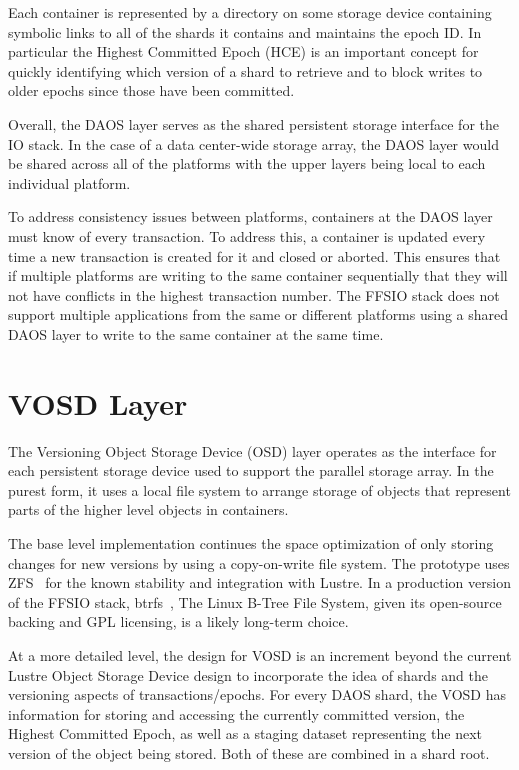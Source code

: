 \documentclass[conference]{IEEEtran}
\begin{document}
Each container is represented by a directory on some storage device containing
symbolic links to all of the shards it contains and maintains the epoch ID.
In particular the Highest Committed Epoch (HCE) is an important concept for
quickly identifying which version of a shard to retrieve and to block writes to
older epochs since those have been committed.

Overall, the DAOS layer serves as the shared persistent storage interface for
the IO stack. In the case of a data center-wide storage array, the DAOS layer
would be shared across all of the platforms with the upper layers being local
to each individual platform.

To address consistency issues between platforms, containers at the DAOS layer
must know of every transaction. To address this, a container is updated every
time a new transaction is created for it and closed or aborted. This ensures
that if multiple platforms are writing to the same container sequentially that
they will not have conflicts in the highest transaction number. The FFSIO stack
does not support multiple applications from the same or different platforms
using a shared DAOS layer to write to the same container at the same time.

\section{VOSD Layer}
\label{sec:vosd}

The Versioning Object Storage Device (OSD) layer operates as the interface for
each persistent storage device used to support the parallel storage array. In
the purest form, it uses a local file system to arrange storage of objects that
represent parts of the higher level objects in containers.

The base level implementation continues the space optimization of only storing
changes for new versions by using a copy-on-write file system. The prototype
uses ZFS~\cite{zhang:2010:zfs} for the known stability and integration with
Lustre. In a production version of the FFSIO stack,
btrfs~\cite{rodeh:2013:btrfs}, The Linux B-Tree File System, given its
open-source backing and GPL licensing, is a likely long-term choice.

At a more detailed level, the design for VOSD is an increment beyond the
current Lustre Object Storage Device design to incorporate the idea of shards
and the versioning aspects of transactions/epochs. For every DAOS shard, the
VOSD has information for storing and accessing the currently committed version,
the Highest Committed Epoch, as well as a staging dataset representing the
next version of the object being stored. Both of these are combined in a shard
root.
\end{document}
